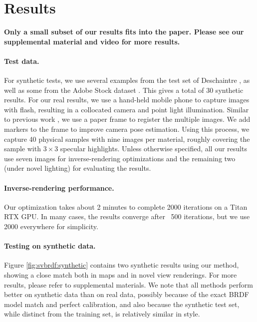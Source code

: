 \section{Results}
\label{sec:svbrdf:results}

\textbf{Only a small subset of our results fits into the paper. Please see our supplemental material and video for more results.}

\paragraph{Test data.}
For synthetic tests, we use several examples from the test set of Deschaintre \cite{deschaintre2018single}, as well as some from the Adobe Stock dataset \cite{li2018materials}. This gives a total of 30 synthetic results.
For our real results, we use a hand-held mobile phone to capture images with flash, resulting in a collocated camera and point light illumination.
Similar to previous work \cite{hui2017reflectance,deschaintre2019flexible}, we use a paper frame to register the multiple images.
We add markers to the frame to improve camera pose estimation.
Using this process, we capture 40 physical samples with nine images per material, roughly covering the sample with $3 \times 3$ specular highlights. 
Unless otherwise specified, all our results use seven images for inverse-rendering optimizations and the remaining two (under novel lighting) for evaluating the results.

\paragraph{Inverse-rendering performance.}
Our optimization takes about 2 minutes to complete 2000 iterations on a Titan RTX GPU. In many cases, the results converge after ~500 iterations, but we use 2000 everywhere for simplicity.



\paragraph{Testing on synthetic data.}
Figure \ref{fig:svbrdf:synthetic} contains two synthetic results using our method, showing a close match both in maps and in novel view renderings. For more results, please refer to supplemental materials. We note that all methods perform better on synthetic data than on real data, possibly because of the exact BRDF model match and perfect calibration, and also
because the synthetic test set, while distinct from the training set, is relatively similar in style.

